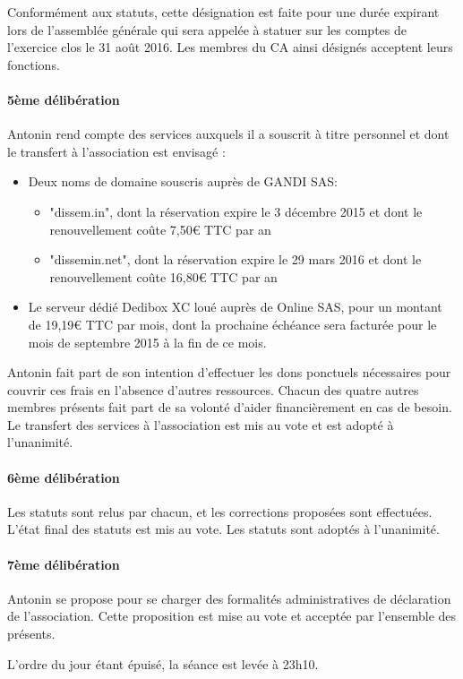 \documentclass[a4paper]{article}
\begin{document}
Conformément aux statuts, cette désignation est faite pour une durée expirant lors de l'assemblée générale qui sera appelée à statuer sur les comptes de l'exercice clos le 31 août 2016. Les membres du CA ainsi désignés acceptent leurs fonctions.

\paragraph{5ème délibération} Antonin rend compte des services auxquels il a souscrit à titre personnel et dont le transfert à l'association est envisagé :
\begin{itemize}
  \item Deux noms de domaine souscris auprès de GANDI SAS:
    \begin{itemize}
        \item "dissem.in", dont la réservation expire le 3 décembre 2015 et dont le renouvellement coûte 7,50\euro{} TTC par an
        \item "dissemin.net", dont la réservation expire le 29 mars 2016 et dont le renouvellement coûte 16,80\euro{} TTC par an
    \end{itemize}
\item Le serveur dédié Dedibox XC loué auprès de Online SAS, pour un montant de 19,19\euro{} TTC par mois, dont la prochaine échéance sera facturée pour le mois de septembre 2015 à la fin de ce mois.
\end{itemize}
    
Antonin fait part de son intention d'effectuer les dons ponctuels nécessaires pour couvrir ces frais en l'absence d'autres ressources. Chacun des quatre autres membres présents fait part de sa volonté d'aider financièrement en cas de besoin. Le transfert des services à l'association est mis au vote et est adopté à l'unanimité.

\paragraph{6ème délibération} Les statuts sont relus par chacun, et les corrections proposées sont effectuées. L'état final des statuts est mis au vote. Les statuts sont adoptés à l'unanimité.

\paragraph{7ème délibération} Antonin se propose pour se charger des formalités administratives de déclaration de l'association. Cette proposition est mise au vote et acceptée par l'ensemble des présents.

\medskip
L'ordre du jour étant épuisé, la séance est levée à 23h10.
\end{document}
